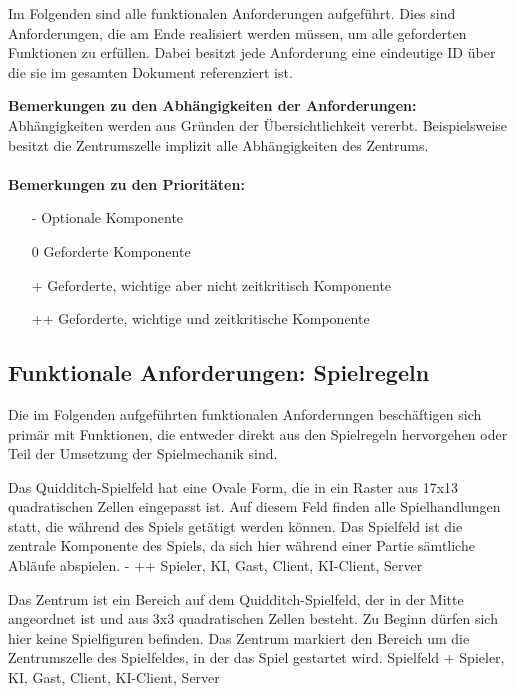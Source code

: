 Im Folgenden sind alle funktionalen Anforderungen aufgeführt. Dies sind Anforderungen, die am Ende realisiert werden müssen, um alle geforderten Funktionen zu erfüllen. Dabei besitzt jede Anforderung eine eindeutige ID über die sie im gesamten Dokument referenziert ist.

\textbf{Bemerkungen zu den Abhängigkeiten der Anforderungen:} \\
Abhängigkeiten werden aus Gründen der Übersichtlichkeit vererbt. Beispielsweise besitzt die Zentrumszelle implizit alle Abhängigkeiten des Zentrums.  \\ \\
 \textbf{Bemerkungen zu den Prioritäten:} \\
 \begin{itemize}
    \item[-] Optionale Komponente
    \item[0] Geforderte Komponente
    \item[+] Geforderte, wichtige aber nicht zeitkritisch Komponente
    \item[++] Geforderte, wichtige und zeitkritische Komponente
 \end{itemize}

\subsection{Funktionale Anforderungen: Spielregeln} 

Die im Folgenden aufgeführten funktionalen Anforderungen beschäftigen sich primär mit Funktionen, die entweder direkt aus den Spielregeln hervorgehen oder Teil der Umsetzung der Spielmechanik sind.

        {Das Quidditch-Spielfeld hat eine Ovale Form, die in ein Raster aus 17x13 quadratischen Zellen eingepasst ist. Auf diesem Feld finden alle Spielhandlungen statt, die während des Spiels getätigt werden können.}
        {Das Spielfeld ist die zentrale Komponente des Spiels, da sich hier während einer Partie sämtliche Abläufe abspielen.}
        {-}
        {++}
        {Spieler, KI, Gast, Client, KI-Client, Server}

        {Das Zentrum ist ein Bereich auf dem Quidditch-Spielfeld, der in der Mitte angeordnet ist und aus 3x3 quadratischen Zellen besteht. Zu Beginn dürfen sich hier keine Spielfiguren befinden.}
        {Das Zentrum markiert den Bereich um die Zentrumszelle des Spielfeldes, in der das Spiel gestartet wird.}
        {Spielfeld}
        {+}
        {Spieler, KI, Gast, Client, KI-Client, Server}

